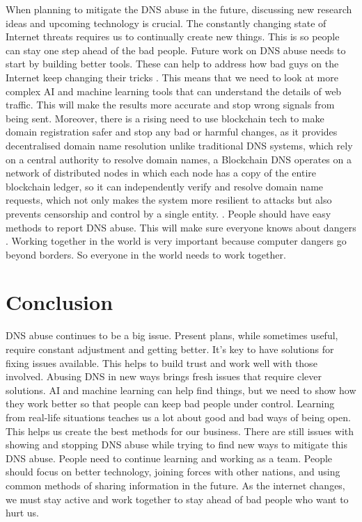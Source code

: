 When planning to mitigate the DNS abuse in the future, discussing new research ideas and upcoming technology is crucial. The constantly changing state of Internet threats requires us to continually create new things. This is so people can stay one step ahead of the bad people. Future work on DNS abuse needs to start by building better tools. These can help to address how bad guys on the Internet keep changing their tricks \cite{bovenzi2023blockchain}. This means that we need to look at more complex AI and machine learning tools that can understand the details of web traffic. This will make the results more accurate and stop wrong signals from being sent. Moreover, there is a rising need to use blockchain tech to make domain registration safer and stop any bad or harmful changes, as it provides decentralised domain name resolution unlike traditional DNS systems, which rely on a central authority to resolve domain names, a Blockchain DNS operates on a network of distributed nodes in which each node has a copy of the entire blockchain ledger, so it can independently verify and resolve domain name requests, which not only makes the system more resilient to attacks but also prevents censorship and control by a single entity. \cite{FinanceStrategists2023BlockchainDNS}.  People should have easy methods to report DNS abuse. This will make sure everyone knows about dangers \cite{gu2021iot}. Working together in the world is very important because computer dangers go beyond borders. So everyone in the world needs to work together. 


\section{Conclusion}

DNS abuse continues to be a big issue. Present plans, while sometimes useful, require constant adjustment and getting better. It's key to have solutions for fixing issues available. This helps to build trust and work well with those involved. Abusing DNS in new ways brings fresh issues that require clever solutions. AI and machine learning can help find things, but we need to show how they work better so that people can keep bad people under control. Learning from real-life situations teaches us a lot about good and bad ways of being open. This helps us create the best methods for our business. There are still issues with showing and stopping DNS abuse while trying to find new ways to mitigate this DNS abuse. People need to continue learning and working as a team. People should focus on better technology, joining forces with other nations, and using common methods of sharing information in the future. As the internet changes, we must stay active and work together to stay ahead of bad people who want to hurt us. 

